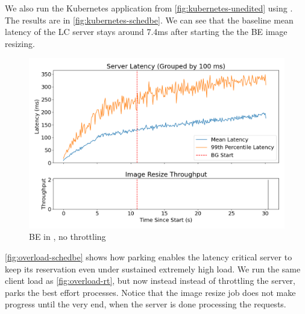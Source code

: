 We also run the Kubernetes application from \autoref{fig:kubernetes-unedited}
using \beclass{}. The results are in \autoref{fig:kubernetes-schedbe}. We can
see that the baseline mean latency of the LC server stays around 7.4ms after
starting the the BE image resizing.

\begin{figure}[t]
    \centering
    \includegraphics[width=\columnwidth]{graphs/overload-schedbe.png}
    \caption{BE in \schedbe{}, no throttling}\label{fig:overload-schedbe}
\end{figure}

\autoref{fig:overload-schedbe} shows how parking enables the latency critical
server to keep its reservation even under sustained extremely high load. We run
the same client load as \autoref{fig:overload-rt}, but now instead instead of
throttling the server, \schedbe{} parks the best effort processes. Notice that
the \schedbe{} image resize job does not make progress until the very end, when
the server is done processing the requests.
